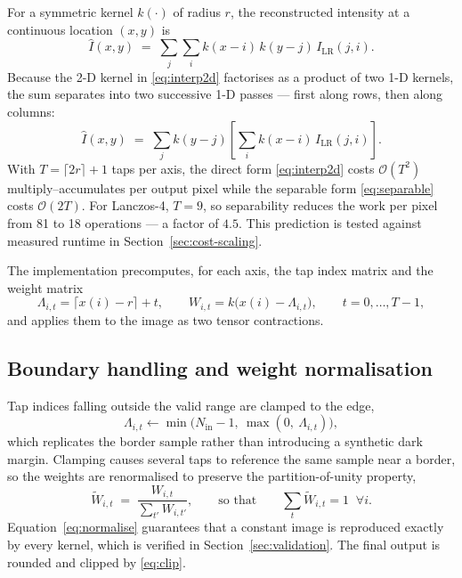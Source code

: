 \documentclass[11pt,a4paper]{article}
\begin{document}
For a symmetric kernel $k(\cdot)$ of radius $r$, the reconstructed intensity at a continuous
location $(x,y)$ is
\begin{equation}
\hat{I}(x,y) \;=\; \sum_{j}\sum_{i} k(x-i)\,k(y-j)\, I_{\text{LR}}(j,i).
\label{eq:interp2d}
\end{equation}
Because the 2-D kernel in \eqref{eq:interp2d} factorises as a product of two 1-D kernels, the
sum separates into two successive 1-D passes --- first along rows, then along columns:
\begin{equation}
\hat{I}(x,y) \;=\; \sum_{j} k(y-j) \left[ \sum_{i} k(x-i)\, I_{\text{LR}}(j,i) \right].
\label{eq:separable}
\end{equation}
With $T = \lceil 2r \rceil + 1$ taps per axis, the direct form \eqref{eq:interp2d} costs
$\mathcal{O}(T^{2})$ multiply--accumulates per output pixel while the separable form
\eqref{eq:separable} costs $\mathcal{O}(2T)$. For Lanczos-4, $T = 9$, so separability reduces
the work per pixel from 81 to 18 operations --- a factor of $4.5$. This prediction is tested
against measured runtime in Section~\ref{sec:cost-scaling}.

The implementation precomputes, for each axis, the tap index matrix and the weight matrix
\begin{equation}
\Lambda_{i,t} = \big\lceil x(i) - r \big\rceil + t,
\qquad
W_{i,t} = k\big(x(i) - \Lambda_{i,t}\big),
\qquad t = 0,\dots,T-1,
\end{equation}
and applies them to the image as two tensor contractions.

\subsection{Boundary handling and weight normalisation}

Tap indices falling outside the valid range are clamped to the edge,
\begin{equation}
\Lambda_{i,t} \leftarrow \min\big(N_{\text{in}}-1,\ \max(0,\ \Lambda_{i,t})\big),
\end{equation}
which replicates the border sample rather than introducing a synthetic dark margin. Clamping
causes several taps to reference the same sample near a border, so the weights are
renormalised to preserve the partition-of-unity property,
\begin{equation}
\widetilde{W}_{i,t} \;=\; \frac{W_{i,t}}{\sum_{t'} W_{i,t'}},
\qquad\text{so that}\qquad \sum_{t} \widetilde{W}_{i,t} = 1 \;\;\forall i.
\label{eq:normalise}
\end{equation}
Equation~\eqref{eq:normalise} guarantees that a constant image is reproduced exactly by every
kernel, which is verified in Section~\ref{sec:validation}. The final output is rounded and
clipped by \eqref{eq:clip}.
\end{document}
